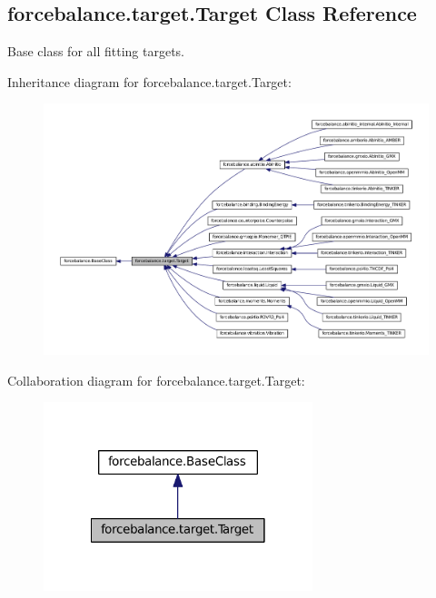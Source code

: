 \hypertarget{classforcebalance_1_1target_1_1Target}{\subsection{forcebalance.\-target.\-Target \-Class \-Reference}
\label{classforcebalance_1_1target_1_1Target}
}


\-Base class for all fitting targets.  




\-Inheritance diagram for forcebalance.\-target.\-Target\-:\nopagebreak
\begin{figure}[H]
\begin{center}
\leavevmode
\includegraphics[width=350pt]{classforcebalance_1_1target_1_1Target__inherit__graph}
\end{center}
\end{figure}


\-Collaboration diagram for forcebalance.\-target.\-Target\-:\nopagebreak
\begin{figure}[H]
\begin{center}
\leavevmode
\includegraphics[width=222pt]{classforcebalance_1_1target_1_1Target__coll__graph}
\end{center}
\end{figure}
